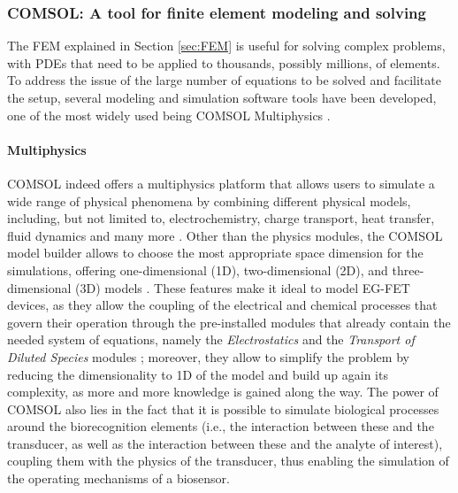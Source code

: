 \subsubsection{COMSOL: A tool for finite element modeling and solving}
The FEM explained in Section \ref{sec:FEM} is useful for solving complex
problems, with PDEs that need to be applied to thousands, possibly millions, of
elements. To address the issue of the large number of equations to be solved and
facilitate the setup, several modeling and simulation software tools have been
developed, one of the most widely used being COMSOL Multiphysics
\citep{comsolCOMSOL_manual}.

\paragraph{Multiphysics}
COMSOL indeed offers a multiphysics platform that allows users to simulate a
wide range of physical phenomena by combining different physical models,
including, but not limited to, electrochemistry, charge transport, heat
transfer, fluid dynamics and many more \citep{comsolCOMSOL_manual}. Other than
the physics modules, the COMSOL model builder allows to choose the most
appropriate space dimension for the simulations, offering one-dimensional (1D),
two-dimensional (2D), and three-dimensional (3D) models
\citep{comsolCOMSOL_manual}. These features make it ideal to model EG-FET
devices, as they allow the coupling of the electrical and chemical processes
that govern their operation through the pre-installed modules that already
contain the needed system of equations, namely the \emph{Electrostatics} and the
\emph{Transport of Diluted Species} modules \citep{delavariNernst2021};
moreover, they allow to simplify the problem by reducing the dimensionality to
1D of the model and build up again its complexity, as more and more knowledge is
gained along the way. The power of COMSOL also lies in the fact that it is
possible to simulate biological processes around the biorecognition elements
(i.e., the interaction between these and the transducer, as well as the
interaction between these and the analyte of interest), coupling them with the
physics of the transducer, thus enabling the simulation of the operating
mechanisms of a biosensor.

